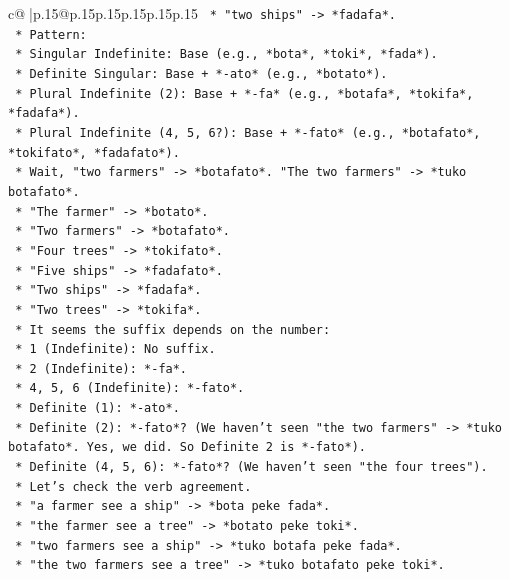 \documentclass{article}
\begin{document}
{\begin{supertabular}{c@{$\;$}|p{.15\linewidth}@{}p{.15\linewidth}p{.15\linewidth}p{.15\linewidth}p{.15\linewidth}p{.15\linewidth}}
{{{\texttt{    *   "two ships" {-}> *fadafa*.} \\
\texttt{    *   Pattern:} \\
\texttt{        *   Singular Indefinite: Base (e.g., *bota*, *toki*, *fada*).} \\
\texttt{        *   Definite Singular: Base + *{-}ato* (e.g., *botato*).} \\
\texttt{        *   Plural Indefinite (2): Base + *{-}fa* (e.g., *botafa*, *tokifa*, *fadafa*).} \\
\texttt{        *   Plural Indefinite (4, 5, 6?): Base + *{-}fato* (e.g., *botafato*, *tokifato*, *fadafato*).} \\
\texttt{    *   Wait, "two farmers" {-}> *botafato*. "The two farmers" {-}> *tuko botafato*.} \\
\texttt{    *   "The farmer" {-}> *botato*.} \\
\texttt{    *   "Two farmers" {-}> *botafato*.} \\
\texttt{    *   "Four trees" {-}> *tokifato*.} \\
\texttt{    *   "Five ships" {-}> *fadafato*.} \\
\texttt{    *   "Two ships" {-}> *fadafa*.} \\
\texttt{    *   "Two trees" {-}> *tokifa*.} \\
\texttt{    *   It seems the suffix depends on the number:} \\
\texttt{        *   1 (Indefinite): No suffix.} \\
\texttt{        *   2 (Indefinite): *{-}fa*.} \\
\texttt{        *   4, 5, 6 (Indefinite): *{-}fato*.} \\
\texttt{        *   Definite (1): *{-}ato*.} \\
\texttt{        *   Definite (2): *{-}fato*? (We haven't seen "the two farmers" {-}> *tuko botafato*. Yes, we did. So Definite 2 is *{-}fato*).} \\
\texttt{        *   Definite (4, 5, 6): *{-}fato*? (We haven't seen "the four trees").} \\
\texttt{    *   Let's check the verb agreement.} \\
\texttt{        *   "a farmer see a ship" {-}> *bota peke fada*.} \\
\texttt{        *   "the farmer see a tree" {-}> *botato peke toki*.} \\
\texttt{        *   "two farmers see a ship" {-}> *tuko botafa peke fada*.} \\
\texttt{        *   "the two farmers see a tree" {-}> *tuko botafato peke toki*.} \\
}}}
\end{supertabular}}
\end{document}
